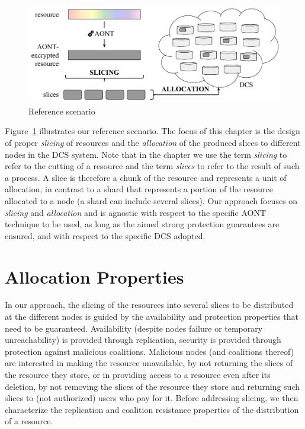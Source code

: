 \begin{figure}
	\begin{center}
		\includegraphics[width=\textwidth]{figures/bdfprs-fig02.pdf}
	\end{center}
	\caption{\label{dcs:fig:scenario}Reference scenario}
\end{figure}

Figure~\ref{dcs:fig:scenario} illustrates our reference scenario.  The
focus of this chapter is the design of proper {\em slicing\/} of
resources and the {\em allocation\/} of the produced slices to
different nodes in the DCS system.  Note that in the chapter we use the
term {\em slicing\/} to refer to the cutting of a resource and the
term {\em slices\/} to refer to the result of such a process.  A slice
is therefore a chunk of the resource and represents a unit of
allocation, in contrast to a shard that represents a portion of the
resource allocated to a node (a shard can include several slices).
Our approach focuses on {\em slicing\/} and {\em allocation\/} and is
agnostic with respect to the specific AONT technique to be used, as
long as the aimed strong protection guarantees are ensured, and with
respect to the specific DCS adopted.




\section{Allocation Properties}\label{dcs:sec:allocation}

In our approach, the slicing of the resources into several slices to
be distributed at the different nodes is guided by the availability
and protection properties that need to be guaranteed.  Availability
(despite nodes failure or temporary unreachability) is provided
through replication, security is provided through protection against
malicious coalitions. Malicious nodes (and coalitions thereof) are
interested in making the resource unavailable, by not returning the
slices of the resource they store, or in providing access to a
resource even after its deletion, by not removing the slices of the
resource they store and returning such slices to (not authorized)
users who pay for it.  Before addressing slicing, we then characterize
the replication and coalition resistance properties of the
distribution of a resource.

